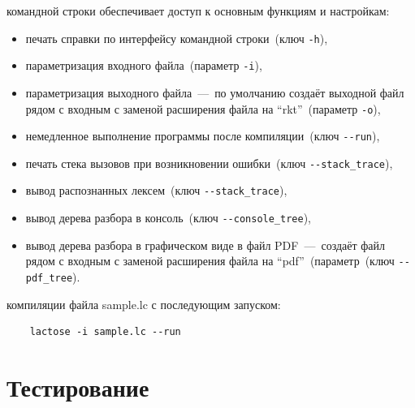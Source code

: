 \documentclass[12pt,a4paper,oneside]{extarticle}
\begin{document}
         командной строки обеспечивает доступ к основным функциям и настройкам:
        \begin{itemize}
                \item печать справки по интерфейсу командной строки~(ключ \lstinline$-h$),
                \item параметризация входного файла~(параметр \lstinline$-i$),
                \item параметризация выходного файла~---~по умолчанию создаёт выходной файл рядом с входным с заменой расширения файла на ``rkt''~(параметр \lstinline$-o$),
                \item немедленное выполнение программы после компиляции~(ключ \lstinline$--run$),
                \item печать стека вызовов при возникновении ошибки~(ключ \lstinline$--stack_trace$),
                \item вывод распознанных лексем~(ключ \lstinline$--stack_trace$),
                \item вывод дерева разбора в консоль~(ключ \lstinline$--console_tree$),
                \item вывод дерева разбора в графическом виде в файл PDF~---~создаёт файл рядом с входным с заменой расширения файла на ``pdf''~(параметр~(ключ \lstinline$--pdf_tree$).
        \end{itemize}

         компиляции файла sample.lc с последующим запуском:
        \begin{lstlisting}        
    lactose -i sample.lc --run
        \end{lstlisting}
\clearpage

\section{Тестирование}
\end{document}
